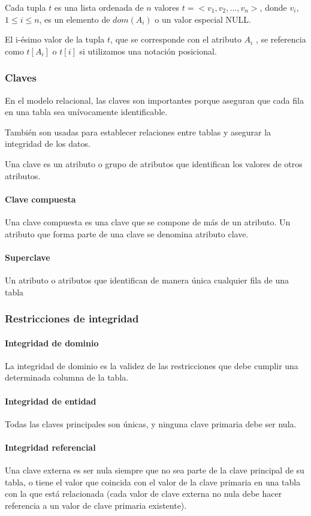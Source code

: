 Cada tupla $t$ es una lista ordenada de $n$ valores $t=<v_1, v_2,...,v_n>$, donde $v_i$, $1 \leq i \leq n$, es un elemento de $dom(A_i)$ o un valor especial NULL.


El i-ésimo valor de la tupla $t$, que se corresponde con el atributo $A_i$ , se referencia como $t[A_i]$ o $t[i]$ si utilizamos una notación posicional.

\subsubsection{Claves}

En el modelo relacional, las claves son importantes porque aseguran que cada fila en una tabla sea unívocamente identificable. 

También son usadas para establecer relaciones entre tablas y asegurar la integridad de los datos.

Una clave es un atributo o grupo de atributos que identifican los valores de otros atributos. 

\paragraph*{Clave compuesta}
Una clave compuesta es una clave que se compone de más de un atributo. Un atributo que forma parte de una clave se denomina atributo clave.

\paragraph*{Superclave}
Un atributo o atributos que identifican de manera única cualquier fila de una tabla

\subsubsection{Restricciones de integridad}
\paragraph*{Integridad de dominio}
La integridad de dominio es la validez de las restricciones que debe cumplir una determinada columna de la tabla.
\paragraph*{Integridad de entidad}
Todas las claves principales son únicas, y ninguna clave primaria debe ser nula.
\paragraph*{Integridad referencial}
Una clave externa es ser nula siempre que no sea parte de la clave principal de su tabla, o tiene el valor que coincida con el valor de la clave primaria en una tabla con la que está relacionada (cada valor de clave externa no nula debe hacer referencia a un valor de clave primaria existente).

